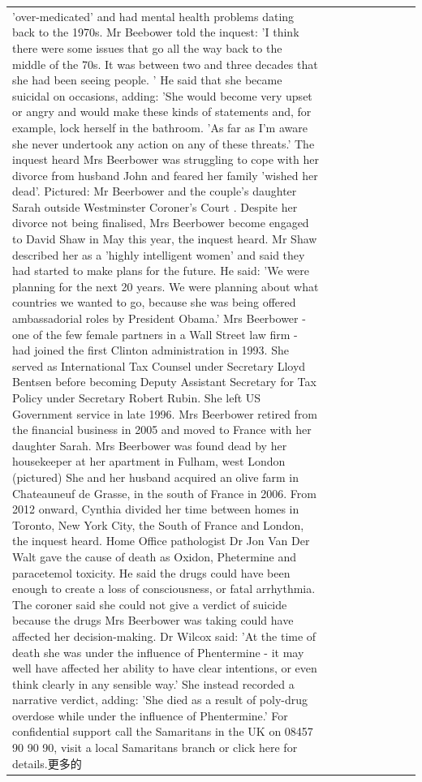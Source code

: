 \begin{table}[H]
\begin{tabular}{lllrlllll}
'over-medicated' and had mental health problems dating back to the 1970s. Mr Beebower told the inquest: 'I think there were some issues that go all the way back to the middle of the 70s. It was between two and three decades that she had been seeing people. ' He said that she became suicidal on occasions, adding: 'She would become very upset or angry and would make these kinds of statements and, for example, lock herself in the bathroom. 'As far as I'm aware she never undertook any action on any of these threats.' The inquest heard Mrs Beerbower was struggling to cope with her divorce from husband John and feared her family 'wished her dead'. Pictured: Mr Beerbower and the couple's daughter Sarah outside Westminster Coroner's Court . Despite her divorce not being finalised, Mrs Beerbower become engaged to David Shaw in May this year, the inquest heard. Mr Shaw described her as a 'highly intelligent women' and said they had started to make plans for the future. He said: 'We were planning for the next 20 years. We were planning about what countries we wanted to go, because she was being offered ambassadorial roles by President Obama.' Mrs Beerbower - one of the few female partners in a Wall Street law firm - had joined the first Clinton administration in 1993. She served as International Tax Counsel under Secretary Lloyd Bentsen before becoming Deputy Assistant Secretary for Tax Policy under Secretary Robert Rubin. She left US Government service in late 1996. Mrs Beerbower retired from the financial business in 2005 and moved to France with her daughter Sarah. Mrs Beerbower was found dead by her housekeeper at her apartment in Fulham, west London (pictured) She and her husband acquired an olive farm in Chateauneuf de Grasse, in the south of France in 2006. From 2012 onward, Cynthia divided her time between homes in Toronto, New York City, the South of France and London, the inquest heard. Home Office pathologist Dr Jon Van Der Walt gave the cause of death as Oxidon, Phetermine and paracetemol toxicity. He said the drugs could have been enough to create a loss of consciousness, or fatal arrhythmia. The coroner said she could not give a verdict of suicide because the drugs Mrs Beerbower was taking could have affected her decision-making. Dr Wilcox said: 'At the time of death she was under the influence of Phentermine - it may well have affected her ability to have clear intentions, or even think clearly in any sensible way.' She instead recorded a narrative verdict, adding: 'She died as a result of poly-drug overdose while under the influence of Phentermine.' For confidential support call the Samaritans in the UK on 08457 90 90 90, visit a local Samaritans branch or click here for details.更多的 \\

\end{tabular}
\end{table}
